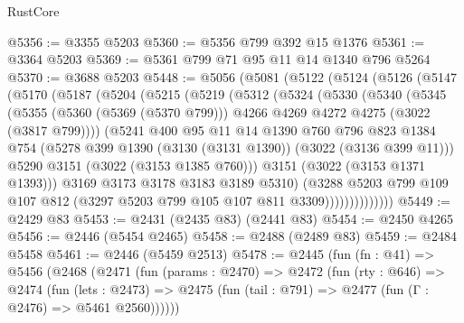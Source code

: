 \begin{lexlean}{RustCore}
\begin{coremodule}
@5356 := @3355 @5203
@5360 := @5356 @799 @392 @15 @1376
@5361 := @3364 @5203
@5369 := @5361 @799 @71 @95 @11 @14 @1340 @796 @5264
@5370 := @3688 @5203
@5448 := @5056
    (@5081
      (@5122
        (@5124
          (@5126
            (@5147
              (@5170
                (@5187
                  (@5204
                    (@5215
                      (@5219
                        (@5312
                          (@5324
                            (@5330
                              (@5340
                                (@5345
                                  (@5355
                                    (@5360 (@5369 (@5370 @799)))
                                    @4266
                                    @4269
                                    @4272
                                    @4275
                                    (@3022 (@3817 @799))))
                                (@5241
                                  @400
                                  @95
                                  @11
                                  @14
                                  @1390
                                  @760
                                  @796
                                  @823
                                  @1384
                                  @754
                                  (@5278 @399 @1390 (@3130 (@3131 @1390)) (@3022 (@3136 @399 @11)))
                                  @5290
                                  @3151
                                  (@3022 (@3153 @1385 @760)))
                                @3151
                                (@3022 (@3153 @1371 @1393)))
                              @3169
                              @3173
                              @3178
                              @3183
                              @3189
                              @5310)
                            (@3288
                              @5203
                              @799
                              @109
                              @107
                              @812
                              (@3297 @5203 @799 @105 @107 @811 @3309))))))))))))))
@5449 := @2429 @83
@5453 := @2431 (@2435 @83) (@2441 @83)
@5454 := @2450 @4265
@5456 := @2446 (@5454 @2465)
@5458 := @2488 (@2489 @83)
@5459 := @2484 @5458
@5461 := @2446 (@5459 @2513)
@5478 := @2445
    (fun (fn : @41) =>
    @5456
      (@2468
        (@2471
          (fun (params : @2470) =>
          @2472
            (fun (rty : @646) =>
            @2474
              (fun (lets : @2473) =>
              @2475 (fun (tail : @791) => @2477 (fun (Γ : @2476) => @5461 @2560))))))

\end{coremodule}
\end{lexlean}
